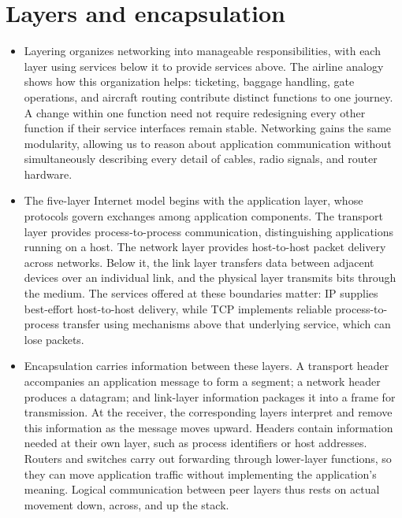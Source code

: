 \documentclass[10pt]{article}
\begin{document}
\section*{Layers and encapsulation}

\begin{itemize}[leftmargin=1.25em, itemsep=0.3em, parsep=0pt, topsep=0pt]
    \item Layering organizes networking into manageable responsibilities, with each layer using services below it to provide services above. The airline analogy shows how this organization helps: ticketing, baggage handling, gate operations, and aircraft routing contribute distinct functions to one journey. A change within one function need not require redesigning every other function if their service interfaces remain stable. Networking gains the same modularity, allowing us to reason about application communication without simultaneously describing every detail of cables, radio signals, and router hardware.

    \item The five-layer Internet model begins with the application layer, whose protocols govern exchanges among application components. The transport layer provides process-to-process communication, distinguishing applications running on a host. The network layer provides host-to-host packet delivery across networks. Below it, the link layer transfers data between adjacent devices over an individual link, and the physical layer transmits bits through the medium. The services offered at these boundaries matter: IP supplies best-effort host-to-host delivery, while TCP implements reliable process-to-process transfer using mechanisms above that underlying service, which can lose packets.

    \item Encapsulation carries information between these layers. A transport header accompanies an application message to form a segment; a network header produces a datagram; and link-layer information packages it into a frame for transmission. At the receiver, the corresponding layers interpret and remove this information as the message moves upward. Headers contain information needed at their own layer, such as process identifiers or host addresses. Routers and switches carry out forwarding through lower-layer functions, so they can move application traffic without implementing the application's meaning. Logical communication between peer layers thus rests on actual movement down, across, and up the stack.
\end{itemize}
\end{document}
